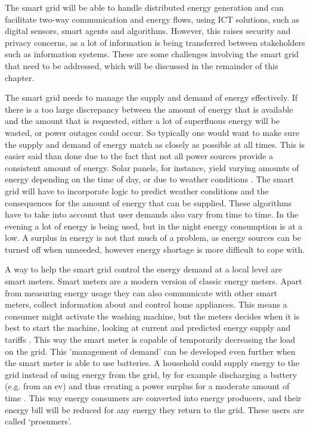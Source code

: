The smart grid will be able to handle distributed energy generation and can facilitate two-way communication and energy flows, using ICT solutions, such as digital sensors, smart agents and algorithms. However, this raises security and privacy concerns, as a lot of information is being transferred between stakeholders such as information systems. These are some challenges involving the smart grid that need to be addressed, which will be discussed in the remainder of this chapter.

The smart grid needs to manage the supply and demand of energy effectively. If there is a too large discrepancy between the amount of energy that is available and the amount that is requested, either a lot of superfluous energy will be wasted, or power outages could occur. So typically one would want to make sure the supply and demand of energy match as closely as possible at all times. This is easier said than done due to the fact that not all power sources provide a consistent amount of energy. Solar panels, for instance, yield varying amounts of energy depending on the time of day, or due to weather conditions \cite{RamchurnVitelingumRogersJennings2014}. The smart grid will have to incorporate logic to predict weather conditions and the consequences for the amount of energy that can be supplied. These algorithms have to take into account that user demands also vary from time to time. In the evening a lot of energy is being used, but in the night energy consumption is at a low. A surplus in energy is not that much of a problem, as energy sources can be turned off when unneeded, however energy shortage is more difficult to cope with.

A way to help the smart grid control the energy demand at a local level are smart meters. Smart meters are a modern version of classic energy meters. Apart from measuring energy usage they can also communicate with other smart meters, collect information about and control home appliances. This means a consumer might activate the washing machine, but the meters decides when it is best to start the machine, looking at current and predicted energy supply and tariffs  \cite{DepuruWangDevabhaktuni2011a}. This way the smart meter is capable of temporarily decreasing the load on the grid. This 'management of demand' can be developed even further when the smart meter is able to use batteries. A household could supply energy to the grid instead of using energy from the grid, by for example discharging a battery (e.g. from an \ac{ev}) and thus creating a power surplus for a moderate amount of time \cite{MwasiluJustoKimEtAl2014}. This way energy consumers are converted into energy producers, and their energy bill will be reduced for any energy they return to the grid. These users are called `prosumers'.

